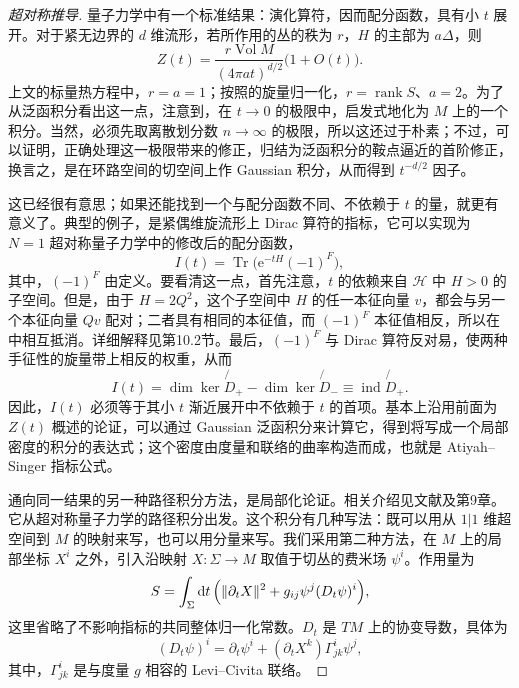 \begin{proof}[超对称推导]
量子力学中有一个标准结果：演化算符，因而配分函数，具有小 $t$ 展开。对于紧无边界的 $d$ 维流形，若所作用的丛的秩为 $r$，$H$ 的主部为 $a\Delta$，则
\[
Z(t)=\frac{r\operatorname{Vol}M}{(4\pi at)^{d/2}}
\bigl(1+O(t)\bigr).
\]
上文的标量热方程中，$r=a=1$；按照的旋量归一化，$r=\operatorname{rank}S$、$a=2$。为了从泛函积分看出这一点，注意到，在 $t\to0$ 的极限中，启发式地化为 $M$ 上的一个积分。当然，必须先取离散划分数 $n\to\infty$ 的极限，所以这还过于朴素；不过，可以证明，正确处理这一极限带来的修正，归结为泛函积分的鞍点逼近的首阶修正，换言之，是在环路空间的切空间上作 Gaussian 积分，从而得到 $t^{-d/2}$ 因子。

这已经很有意思；如果还能找到一个与配分函数不同、不依赖于 $t$ 的量，就更有意义了。典型的例子，是紧偶维旋流形上 Dirac 算符的指标，它可以实现为 $N=1$ 超对称量子力学中的修改后的配分函数，
\begin{equation}\label{eq:3.18}
I(t)=\operatorname{Tr}\bigl(\mathrm{e}^{-tH}(-1)^F\bigr),
\end{equation}
其中，$(-1)^F$ 由定义。要看清这一点，首先注意，$t$ 的依赖来自 $\mathcal{H}$ 中 $H>0$ 的子空间。但是，由于 $H=2Q^2$，这个子空间中 $H$ 的任一本征向量 $v$，都会与另一个本征向量 $Qv$ 配对；二者具有相同的本征值，而 $(-1)^F$ 本征值相反，所以在中相互抵消。详细解释见第10.2节。最后，$(-1)^F$ 与 Dirac 算符反对易，使两种手征性的旋量带上相反的权重，从而
\[
I(t)=\dim\operatorname{ker}\not{D}_+
-\dim\operatorname{ker}\not{D}_-
\equiv\operatorname{ind}\not{D}_+.
\]
因此，$I(t)$ 必须等于其小 $t$ 渐近展开中不依赖于 $t$ 的首项。基本上沿用前面为 $Z(t)$ 概述的论证，可以通过 Gaussian 泛函积分来计算它，得到将写成一个局部密度的积分的表达式；这个密度由度量和联络的曲率构造而成，也就是 Atiyah--Singer 指标公式。

通向同一结果的另一种路径积分方法，是局部化论证。相关介绍见文献及第9章。它从超对称量子力学的路径积分出发。这个积分有几种写法：既可以用从 $1|1$ 维超空间到 $M$ 的映射来写，也可以用分量来写。我们采用第二种方法，在 $M$ 上的局部坐标 $X^i$ 之外，引入沿映射 $X\colon\Sigma\to M$ 取值于切丛的费米场 $\psi^i$。作用量为
\[
S=\int_\Sigma\mathrm{d}t\,
\Bigl(\|\partial_tX\|^2+g_{ij}\psi^j(D_t\psi)^i\Bigr),
\]
这里省略了不影响指标的共同整体归一化常数。$D_t$ 是 $TM$ 上的协变导数，具体为
\[
(D_t\psi)^i=\partial_t\psi^i
+(\partial_tX^k)\Gamma^i_{jk}\psi^j,
\]
其中，$\Gamma^i_{jk}$ 是与度量 $g$ 相容的 Levi--Civita 联络。


\end{proof}
